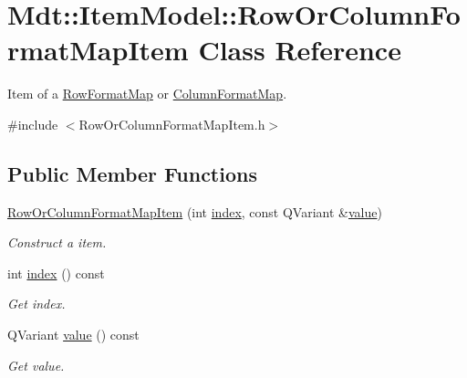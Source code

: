 \hypertarget{class_mdt_1_1_item_model_1_1_row_or_column_format_map_item}{}\section{Mdt\+:\+:Item\+Model\+:\+:Row\+Or\+Column\+Format\+Map\+Item Class Reference}
\label{class_mdt_1_1_item_model_1_1_row_or_column_format_map_item}


Item of a \hyperlink{class_mdt_1_1_item_model_1_1_row_format_map}{Row\+Format\+Map} or \hyperlink{class_mdt_1_1_item_model_1_1_column_format_map}{Column\+Format\+Map}.  




{\ttfamily \#include $<$Row\+Or\+Column\+Format\+Map\+Item.\+h$>$}

\subsection*{Public Member Functions}
\begin{DoxyCompactItemize}
\item 
\hyperlink{class_mdt_1_1_item_model_1_1_row_or_column_format_map_item_a6e95a8c3620921934258cde3a5562c0e}{Row\+Or\+Column\+Format\+Map\+Item} (int \hyperlink{class_mdt_1_1_item_model_1_1_row_or_column_format_map_item_a143111815ea0c85da978d82ad10b73ea}{index}, const Q\+Variant \&\hyperlink{class_mdt_1_1_item_model_1_1_row_or_column_format_map_item_afa13a1311b4216cafda00c42a4f29858}{value})
\begin{DoxyCompactList}\small\item\em Construct a item. \end{DoxyCompactList}\item 
int \hyperlink{class_mdt_1_1_item_model_1_1_row_or_column_format_map_item_a143111815ea0c85da978d82ad10b73ea}{index} () const \hypertarget{class_mdt_1_1_item_model_1_1_row_or_column_format_map_item_a143111815ea0c85da978d82ad10b73ea}{}\label{class_mdt_1_1_item_model_1_1_row_or_column_format_map_item_a143111815ea0c85da978d82ad10b73ea}

\begin{DoxyCompactList}\small\item\em Get index. \end{DoxyCompactList}\item 
Q\+Variant \hyperlink{class_mdt_1_1_item_model_1_1_row_or_column_format_map_item_afa13a1311b4216cafda00c42a4f29858}{value} () const \hypertarget{class_mdt_1_1_item_model_1_1_row_or_column_format_map_item_afa13a1311b4216cafda00c42a4f29858}{}\label{class_mdt_1_1_item_model_1_1_row_or_column_format_map_item_afa13a1311b4216cafda00c42a4f29858}

\begin{DoxyCompactList}\small\item\em Get value. \end{DoxyCompactList}\end{DoxyCompactItemize}


